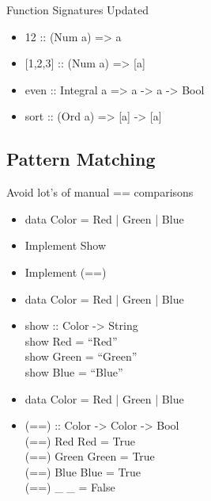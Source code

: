 \documentclass{beamer}                  %
\newcommand{\srule}{
	\rule{\textwidth}{1pt}\\
}
\newlength{\subsecwidth}
\newenvironment{slide}{
	\begin{frame} %
	\settowidth{\subsecwidth}{\insertsubsection} %
	\ifthenelse{\dimtest{\subsecwidth}{<}{1pt}}{ %
		\frametitle{\insertsection\\             %
		\vspace{-1ex}                            %
		\color{fore}\srule                       %
		\par                                     %
		\vspace{-3ex}                            %
		}
	}{                                           %
		\frametitle{\insertsection\ -- \insertsubsection\\ %
		\vspace{-1ex}                            %
		\color{fore}\srule                       %
		\par                                     %
		\vspace{-3ex}                            %
		}
	}
	\Large                                       %
}{
	\end{frame}
}
\begin{document}
\begin{slide}
  Function Signatures Updated
  \begin{itemize}
    \item 12 :: (Num a) => a
    \item{} [1,2,3] :: (Num a) => [a]
    \item even :: Integral a => a -> a -> Bool
    \item sort :: (Ord a) => [a] -> [a]
  \end{itemize}
\end{slide}

\subsection{Pattern Matching}

\begin{slide}
  Avoid lot's of manual == comparisons
  \begin{itemize}
    \item data Color = Red | Green | Blue
    \item Implement Show
    \item Implement (==)
  \end{itemize}
\end{slide}

\begin{slide}
  \begin{itemize}
    \item data Color = Red | Green | Blue
      \item
        show :: Color -> String\\
        show Red = ``Red''\\
        show Green = ``Green''\\
        show Blue = ``Blue''
  \end{itemize}
\end{slide}

\begin{slide}
  \begin{itemize}
    \item data Color = Red | Green | Blue
    \item
        (==) :: Color -> Color -> Bool\\
        (==) Red Red     = True\\
        (==) Green Green = True\\
        (==) Blue Blue   = True\\
        (==) \_ \_         = False
  \end{itemize}
\end{slide}
\end{document}
